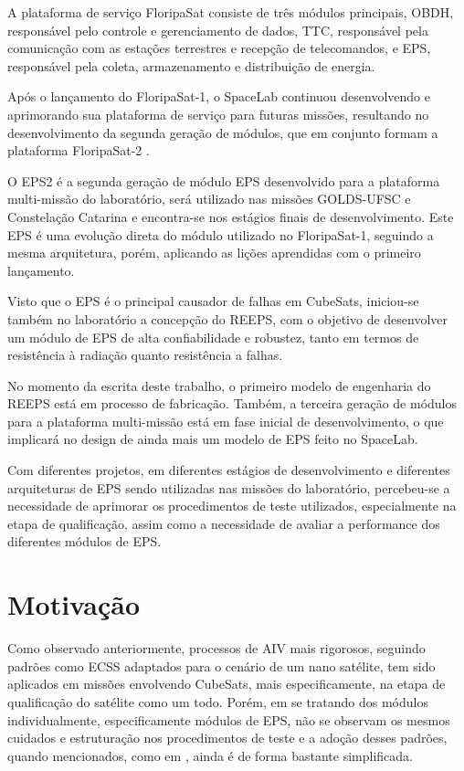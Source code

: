 A plataforma de serviço FloripaSat consiste de três módulos principais, \gls{OBDH}, responsável pelo controle e gerenciamento de dados, \gls{TTC}, responsável pela comunicação com as estações terrestres e recepção de telecomandos, e \gls{EPS}, responsável pela coleta, armazenamento e distribuição de energia.

Após o lançamento do FloripaSat-1, o SpaceLab continuou desenvolvendo e aprimorando sua plataforma de serviço para futuras missões, resultando no desenvolvimento da segunda geração de módulos, que em conjunto formam a plataforma FloripaSat-2 \cite{floripasat2}.

O \gls{EPS2} é a segunda geração de módulo \gls{EPS} desenvolvido para a plataforma multi-missão do laboratório, será utilizado nas missões GOLDS-UFSC e Constelação Catarina e encontra-se nos estágios finais de desenvolvimento. Este \gls{EPS} é uma evolução direta do módulo utilizado no FloripaSat-1, seguindo a mesma arquitetura, porém, aplicando as lições aprendidas com o primeiro lançamento.

Visto que o \gls{EPS} é o principal causador de falhas em CubeSats, iniciou-se também no laboratório a concepção do \gls{REEPS}, com o objetivo de desenvolver um módulo de \gls{EPS} de alta confiabilidade e robustez, tanto em termos de resistência à radiação quanto resistência a falhas.

No momento da escrita deste trabalho, o primeiro modelo de engenharia do \gls{REEPS} está em processo de fabricação.
Também, a terceira geração de módulos para a plataforma multi-missão está em fase inicial de desenvolvimento, o que implicará no design de ainda mais um modelo de \gls{EPS} feito no SpaceLab.

Com diferentes projetos, em diferentes estágios de desenvolvimento e diferentes arquiteturas de \gls{EPS} sendo utilizadas nas missões do laboratório, percebeu-se a necessidade de aprimorar os procedimentos de teste utilizados, especialmente na etapa de qualificação, assim como a necessidade de avaliar a performance dos diferentes módulos de \gls{EPS}.

\section{Motivação}\label{sec:intro-motivacao}

Como observado anteriormente, processos de \gls{AIV} mais rigorosos, seguindo padrões como \gls{ECSS} adaptados para o cenário de um nano satélite, tem sido aplicados em missões envolvendo CubeSats, mais especificamente, na etapa de qualificação do satélite como um todo.
Porém, em se tratando dos módulos individualmente, especificamente módulos de EPS, não se observam os mesmos cuidados e estruturação nos procedimentos de teste e a adoção desses padrões, quando mencionados, como em \textcite{mist-eps}, ainda é de forma bastante simplificada.

